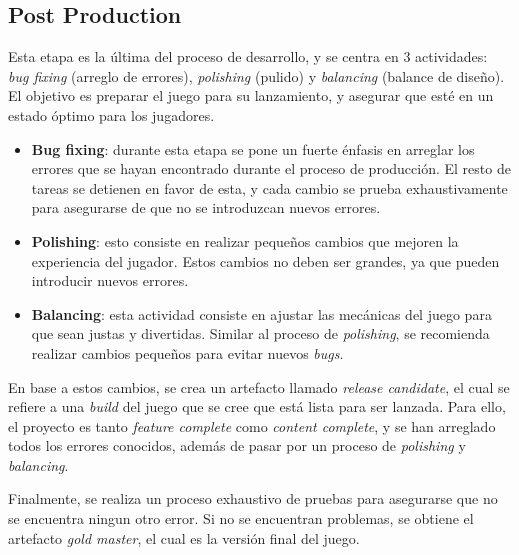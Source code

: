 \subsection{Post Production}
\par Esta etapa es la última del proceso de desarrollo, y se centra en 3 actividades: \textit{bug fixing} (arreglo de errores), \textit{polishing} (pulido) y \textit{balancing} (balance de diseño). El objetivo es preparar el juego para su lanzamiento, y asegurar que esté en un estado óptimo para los jugadores.
\begin{itemize}
    \item \textbf{Bug fixing}: durante esta etapa se pone un fuerte énfasis en arreglar los errores que se hayan encontrado durante el proceso de producción. El resto de tareas se detienen en favor de esta, y cada cambio se prueba exhaustivamente para asegurarse de que no se introduzcan nuevos errores.
    \item \textbf{Polishing}: esto consiste en realizar pequeños cambios que mejoren la experiencia del jugador. Estos cambios no deben ser grandes, ya que pueden introducir nuevos errores.
    \item \textbf{Balancing}: esta actividad consiste en ajustar las mecánicas del juego para que sean justas y divertidas. Similar al proceso de \textit{polishing}, se recomienda realizar cambios pequeños para evitar nuevos \textit{bugs}.
\end{itemize}
\par En base a estos cambios, se crea un artefacto llamado \textit{release candidate}, el cual se refiere a una \textit{build} del juego que se cree que está lista para ser lanzada. Para ello, el proyecto es tanto \textit{feature complete} como \textit{content complete}, y se han arreglado todos los errores conocidos, además de pasar por un proceso de \textit{polishing} y \textit{balancing}.
\par Finalmente, se realiza un proceso exhaustivo de pruebas para asegurarse que no se encuentra ningun otro error. Si no se encuentran problemas, se obtiene el artefacto \textit{gold master}, el cual es la versión final del juego. 


